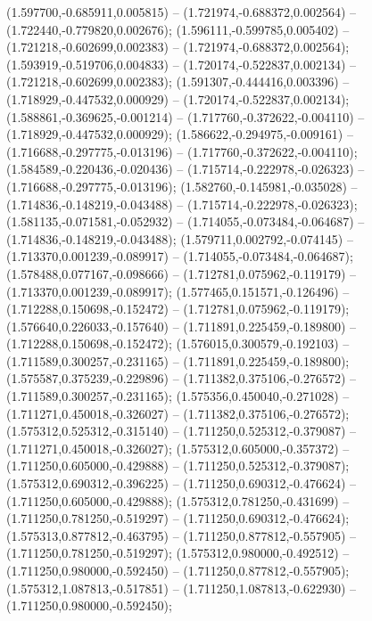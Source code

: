  (1.597700,-0.685911,0.005815) -- (1.721974,-0.688372,0.002564) -- (1.722440,-0.779820,0.002676);
 (1.596111,-0.599785,0.005402) -- (1.721218,-0.602699,0.002383) -- (1.721974,-0.688372,0.002564);
 (1.593919,-0.519706,0.004833) -- (1.720174,-0.522837,0.002134) -- (1.721218,-0.602699,0.002383);
 (1.591307,-0.444416,0.003396) -- (1.718929,-0.447532,0.000929) -- (1.720174,-0.522837,0.002134);
 (1.588861,-0.369625,-0.001214) -- (1.717760,-0.372622,-0.004110) -- (1.718929,-0.447532,0.000929);
 (1.586622,-0.294975,-0.009161) -- (1.716688,-0.297775,-0.013196) -- (1.717760,-0.372622,-0.004110);
 (1.584589,-0.220436,-0.020436) -- (1.715714,-0.222978,-0.026323) -- (1.716688,-0.297775,-0.013196);
 (1.582760,-0.145981,-0.035028) -- (1.714836,-0.148219,-0.043488) -- (1.715714,-0.222978,-0.026323);
 (1.581135,-0.071581,-0.052932) -- (1.714055,-0.073484,-0.064687) -- (1.714836,-0.148219,-0.043488);
 (1.579711,0.002792,-0.074145) -- (1.713370,0.001239,-0.089917) -- (1.714055,-0.073484,-0.064687);
 (1.578488,0.077167,-0.098666) -- (1.712781,0.075962,-0.119179) -- (1.713370,0.001239,-0.089917);
 (1.577465,0.151571,-0.126496) -- (1.712288,0.150698,-0.152472) -- (1.712781,0.075962,-0.119179);
 (1.576640,0.226033,-0.157640) -- (1.711891,0.225459,-0.189800) -- (1.712288,0.150698,-0.152472);
 (1.576015,0.300579,-0.192103) -- (1.711589,0.300257,-0.231165) -- (1.711891,0.225459,-0.189800);
 (1.575587,0.375239,-0.229896) -- (1.711382,0.375106,-0.276572) -- (1.711589,0.300257,-0.231165);
 (1.575356,0.450040,-0.271028) -- (1.711271,0.450018,-0.326027) -- (1.711382,0.375106,-0.276572);
 (1.575312,0.525312,-0.315140) -- (1.711250,0.525312,-0.379087) -- (1.711271,0.450018,-0.326027);
 (1.575312,0.605000,-0.357372) -- (1.711250,0.605000,-0.429888) -- (1.711250,0.525312,-0.379087);
 (1.575312,0.690312,-0.396225) -- (1.711250,0.690312,-0.476624) -- (1.711250,0.605000,-0.429888);
 (1.575312,0.781250,-0.431699) -- (1.711250,0.781250,-0.519297) -- (1.711250,0.690312,-0.476624);
 (1.575313,0.877812,-0.463795) -- (1.711250,0.877812,-0.557905) -- (1.711250,0.781250,-0.519297);
 (1.575312,0.980000,-0.492512) -- (1.711250,0.980000,-0.592450) -- (1.711250,0.877812,-0.557905);
 (1.575312,1.087813,-0.517851) -- (1.711250,1.087813,-0.622930) -- (1.711250,0.980000,-0.592450);
